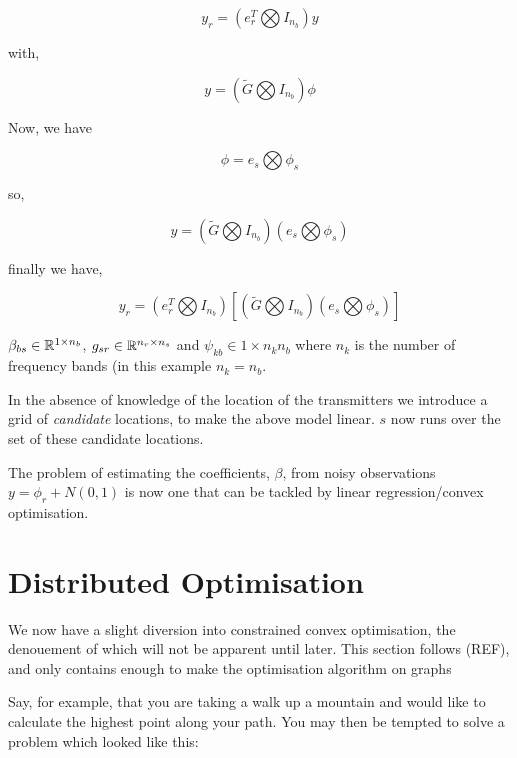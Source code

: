 \documentclass{article}
\begin{document}
\begin{equation}
y_r = \left(	e_r^T \bigotimes I_{n_b}\right) y
\end{equation}

with,

\begin{equation}
y = \left( \tilde{G} \bigotimes I_{n_b} \right) \phi
\end{equation}

Now, we have

\begin{equation}
\phi = e_s \bigotimes \phi_s
\end{equation}

so,

\begin{equation}
y = \left( \tilde{G} \bigotimes I_{n_b} \right) \left(e_s \bigotimes \phi_s \right)
\end{equation}

finally we have,

\begin{equation}
y_r = \left(	e_r^T \bigotimes I_{n_b}\right)\left[\left( \tilde{G} \bigotimes I_{n_b} \right) \left(e_s \bigotimes \phi_s \right)\right]
\end{equation}

\(\beta_{bs} \in {\mathbb{R}}^{1 \times n_b}\), \(g_{sr} \in {\mathbb{R}}^{n_r \times n_s}\) and \(\psi_{kb} \in 1 \times n_k n_b\) where \(n_k\) is the number of frequency bands (in this example \(n_k = n_b\).

In the absence of knowledge of the location of the transmitters we introduce a grid of \textit{candidate} locations, to make the above model linear. \(s\) now runs over the set of these candidate locations.

The problem of estimating the coefficients, \(\beta\), from noisy observations \(y = \phi_r + N\left(0,1\right)\) is now one that can be tackled by linear regression/convex optimisation.


\section{Distributed Optimisation}
We now have a slight diversion into constrained convex optimisation, the denouement of which will not be apparent until later. This section follows (REF), and only contains enough to make the optimisation algorithm on graphs

Say, for example, that you are taking a walk up a mountain and would like to calculate the highest point along your path. You may then be tempted to solve a problem which looked like this:
\end{document}

